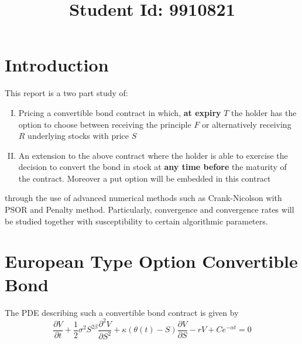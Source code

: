 \documentclass{article}
\begin{document}
\title{Student Id: 9910821}
\date{}

\maketitle
\section*{Introduction}
This report is a two part study of:
\begin{enumerate}[I)]
  \item Pricing a convertible bond contract in  which, \textbf{at expiry} $T$ the  holder  has  the option to  choose  between  receiving the principle $F$ or alternatively receiving $R$ underlying stocks with price $S$
  \item An extension to the above contract where the holder is able to exercise the decision to convert the bond in stock at \textbf{any time before} the maturity of the contract. Moreover a put option will be embedded in this contract
\end{enumerate}
through the use of advanced numerical methods such as Crank-Nicolson with PSOR and Penalty method.
Particularly, convergence and convergence rates will be studied together with susceptibility to certain algorithmic parameters.

\section{European Type Option Convertible Bond}
The PDE describing such a convertible bond contract is given by
\begin{equation}
  \frac{\partial V}{\partial t} + \frac{1}{2}\sigma^{2}S^{2\beta}\frac{\partial^2 V}{\partial S^2}+\kappa(\theta (t) -S)\frac{\partial V}{\partial S} -rV + Ce^{-\alpha t} =0
  \label{eq:pde_convertible}
\end{equation}
\end{document}
